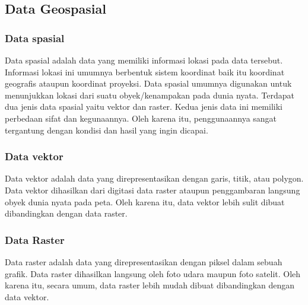 \subsection{Data Geospasial}
\subsubsection{Data spasial}
Data spasial adalah data yang memiliki informasi lokasi pada data tersebut. Informasi lokasi ini umumnya berbentuk sistem koordinat baik itu koordinat geografis ataupun koordinat proyeksi.
Data spasial umumnya digunakan untuk menunjukkan lokasi dari suatu obyek/kenampakan pada dunia nyata.
Terdapat dua jenis data spasial yaitu vektor dan raster. Kedua jenis data ini memiliki perbedaan sifat dan kegunaannya. Oleh karena itu, penggunaannya sangat tergantung dengan kondisi dan hasil yang ingin dicapai.
\subsubsection{Data vektor}
Data vektor adalah data yang direpresentasikan dengan garis, titik, atau polygon. Data vektor dihasilkan dari digitasi data raster ataupun penggambaran langsung obyek dunia nyata pada peta. Oleh karena itu, data vektor lebih sulit dibuat dibandingkan dengan data raster.
\subsubsection{Data Raster}
Data raster adalah data yang direpresentasikan dengan piksel dalam sebuah grafik. Data raster dihasilkan langsung oleh foto udara maupun foto satelit. Oleh karena itu, secara umum, data raster lebih mudah dibuat dibandingkan dengan data vektor.
